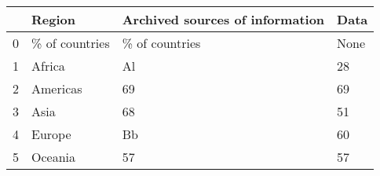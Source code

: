 \begin{tabular}{llll}
\toprule
{} &          Region & Archived sources of information &  Data \\
\midrule
0 &  \% of countries &                  \% of countries &  None \\
1 &          Africa &                              Al &    28 \\
2 &        Americas &                              69 &    69 \\
3 &            Asia &                              68 &    51 \\
4 &          Europe &                              Bb &    60 \\
5 &         Oceania &                              57 &    57 \\
\bottomrule
\end{tabular}
